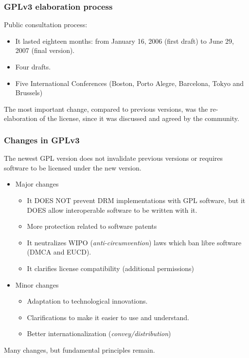 \begin{frame}
\frametitle{GPLv3 elaboration process}

Public consultation process:
\begin{itemize}
\item It lasted eighteen months: from January 16, 2006 (first draft) to June 29, 2007 (final version).
\item Four drafts. 
\item Five International Conferences (Boston, Porto Alegre, Barcelona, Tokyo and Brussels)
\end{itemize}

\pause

The most important change, compared to previous versions, was the re-elaboration of the license, since it was discussed and agreed by the community.
\end{frame}

\begin{frame}
\frametitle{Changes in GPLv3}
The newest GPL version does not invalidate previous versions or requires software to be licensed under the new version.
\begin{itemize}
\item Major changes
    \begin{itemize}
        \item It DOES NOT prevent DRM implementations with GPL software, but it DOES allow interoperable software to be written with it.
        \item {More protection related to software patents}
        \item It neutralizes WIPO (\textit{anti-circumvention}) laws which ban libre software (DMCA and EUCD).
        \item It clarifies license compatibility (additional permissions)
    \end{itemize}
\item Minor changes
    \begin{itemize}
        \item Adaptation to technological innovations.
        \item Clarifications to make it easier to use and understand.
        \item Better internationalization (\textit{convey/distribution})
    \end{itemize}
\end{itemize}

\pause

Many changes, but fundamental principles remain.

\end{frame}



